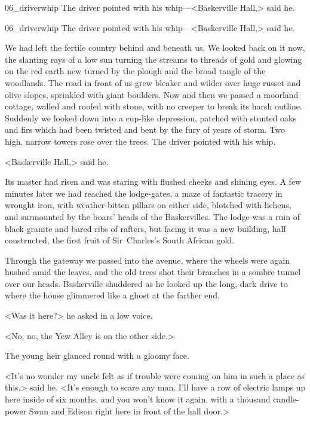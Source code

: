 \begin{letter}
	\begin{bwbigpic}
			[1.0]  
		{06_driverwhip}
		{The driver pointed with his whip—<Baskerville Hall,> said he.}
	\end{bwbigpic}
\end{letter}
\begin{a4}
	\begin{bwbigpic}
		[1.0] 
		{06_driverwhip}
		{The driver pointed with his whip—<Baskerville Hall,> said he.}
	\end{bwbigpic}
\end{a4}

We had left the fertile country behind and beneath us. We looked back on it now, the slanting rays of a low sun turning the streams to threads of gold and glowing on the red earth new turned by the plough and the broad tangle of the woodlands. The road in front of us grew bleaker and wilder over huge russet and olive slopes, sprinkled with giant boulders. Now and then we passed a moorland cottage, walled and roofed with stone, with no creeper to break its harsh outline. Suddenly we looked down into a cup-like depression, patched with stunted oaks and firs which had been twisted and bent by the fury of years of storm. Two high, narrow towers rose over the trees. The driver pointed with his whip.

<Baskerville Hall,> said he.

Its master had risen and was staring with flushed cheeks and shining eyes. A few minutes later we had reached the lodge-gates, a maze of fantastic tracery in wrought iron, with weather-bitten pillars on either side, blotched with lichens, and surmounted by the boars' heads of the Baskervilles. The lodge was a ruin of black granite and bared ribs of rafters, but facing it was a new building, half constructed, the first fruit of Sir~Charles's South African gold.

Through the gateway we passed into the avenue, where the wheels were again hushed amid the leaves, and the old trees shot their branches in a sombre tunnel over our heads. Baskerville shuddered as he looked up the long, dark drive to where the house glimmered like a ghost at the farther end.

<Was it here?> he asked in a low voice.

<No, no, the Yew Alley is on the other side.>

The young heir glanced round with a gloomy face.

<It's no wonder my uncle felt as if trouble were coming on him in such a place as this,> said he. <It's enough to scare any man. I'll have a row of electric lamps up here inside of six months, and you won't know it again, with a thousand candle-power Swan and Edison right here in front of the hall door.>

